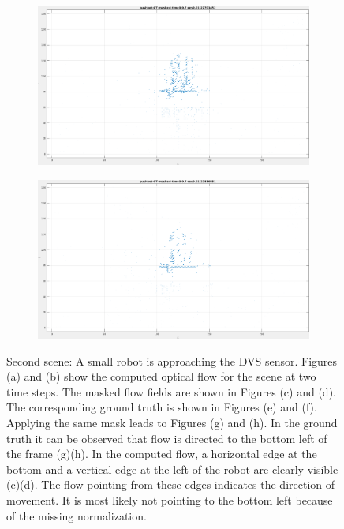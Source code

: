 \begin{figure}[tb]
\begin{subfigure}{.45\textwidth}
  \caption{}
\end{subfigure}
\begin{subfigure}{.45\textwidth}
  \centering
  \includegraphics[height=.6\linewidth]{figs/pushbot/pushbot-GT-masked-1.png}
  \caption{}
\end{subfigure}
\begin{subfigure}{.45\textwidth}
  \centering
  \includegraphics[height=.6\linewidth]{figs/pushbot/pushbot-GT-masked-2.png}
  \caption{}
\end{subfigure}
\caption[Second scene: Robot approaching the DVS sensor.]{Second scene: A small robot is approaching the DVS sensor. Figures (a) and (b) show the computed optical flow for the scene at two time steps. The masked flow fields are shown in Figures (c) and (d).
The corresponding ground truth is shown in Figures (e) and (f). Applying the same mask leads to Figures (g) and (h).
In the ground truth it can be observed that flow is directed to the bottom left of the frame (g)(h). 
In the computed flow, a horizontal edge at the bottom and a vertical edge at the left of the robot are clearly visible (c)(d).
The flow pointing from these edges indicates the direction of movement. 
It is most likely not pointing to the bottom left because of the missing normalization.}
\label{fig:pushbot-snapshots}
\end{figure}

